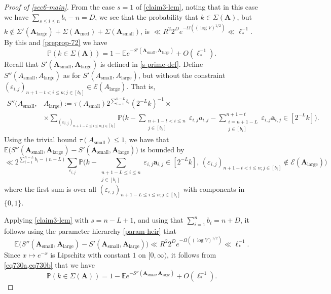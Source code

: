 \documentclass[11pt,reqno]{amsart}
\numberwithin{equation}{section}
\theoremstyle{definition}
\theoremstyle{remark}
\newcommand{\mb}{\mathbb}
\newcommand{\mbf}{\mathbf}
\newcommand{\eps}{\varepsilon}
\renewcommand{\le}{\leqslant}
\def\sml{\operatorname{small}}
\def\lrg{\operatorname{large}}
\def\med{\operatorname{med}}
\begin{document}
\begin{proof}[Proof of \cref{sec6-main}] From the case $s = 1$ of \cref{claim3-lem}, noting that in this case we have $\sum_{s \le i \le n}  b_i - n = D$, we see that the probability that $k \in \Sigma(\mbf{A})$, but $k \notin \Sigma'(\mbf{A}_{\lrg}) + \Sigma(\mbf{A}_{\med}) + \Sigma(\mbf{A}_{\sml})$, is $\ll R^2 2^{D}e^{-\Omega((\log V)^{1/2})} \ll \ell_*^{-1}$. By this and \cref{preprop-72} we have
\begin{equation}\label{eq730a} \mb{P}(k \in \Sigma(\mbf{A})) =  1 - \mb{E} e^{-S'(\mbf{A}_{\sml}, \mbf{A}_{\lrg})}  + O(\ell_*^{-1}).\end{equation} Recall that $S'(\mbf{A}_{\sml}, \mbf{A}_{\lrg})$ is defined in \cref{s-prime-def}. Define $S''(A_{\sml}, A_{\lrg})$ as for $S'(A_{\sml}, A_{\lrg})$, but without the constraint $(\eps_{i,j})_{n + 1 - t < i \le n;j \in [b_i]} \in \mathcal{E}(A_{\lrg})$. That is, 
\begin{align}\nonumber S''(A_{\sml}, & A_{\lrg}) := \tau(A_{\sml})2^{\sum_{i = 1}^{n - L} b_i} (2^{-L}k)^{-1} \times \\ & \times \sum_{(\eps_{i,j})_{ n +1 - L \le i \le n ; j \in [b_i]}}\mb{P} \big(k - \sum_{\substack{n + 1 - t < i \le n \\ j \in [b_i]}} \eps_{i,j} a_{i,j}  - \sum_{\substack{i = n+1 - L\\ j \in [b_i]}}^{n +1 - t} \eps_{i,j} \mathbf{a}_{i,j}  \in [2^{- L}k] \big)  .\label{s-prime-double-def}\end{align}
Using the trivial bound $\tau(A_{\sml}) \le 1$, we have that $\mb{E}\big( S''(\mbf{A}_{\sml},  \mbf{A}_{\lrg})  - S'(\mbf{A}_{\sml}, \mbf{A}_{\lrg})\big)$ is bounded by
\[ \ll 2^{\sum_{i=1}^{n - L} b_i - (n - L)}\sum_{\eps_{i,j}} \mb{P} \big( k  - \sum_{\substack{n + 1 - L \le i \le n \\j \in [b_i]}} \eps_{i,j} \mathbf{a}_{i,j}  \in [2^{- L}k],\, (\eps_{i,j})_{n +1 - t < i \le n; j \in [b_i]} \notin \mathcal{E}(\mbf{A}_{\lrg}) \big) \] where the first sum is over all $(\eps_{i,j})_{ n +1 - L \le i \le n ; j \in [b_i]}$ with components in $\{0,1\}$.


Applying \cref{claim3-lem} with $s = n -  L + 1$, and using that $\sum_{i = 1}^n b_i = n + D$, it follows using the parameter hierarchy \cref{param-heir} that
\begin{equation}\label{eq730b} \mb{E}\big( S''(\mbf{A}_{\sml},  \mbf{A}_{\lrg})  - S'(\mbf{A}_{\sml}, \mbf{A}_{\lrg})\big) \ll R^2 2^{D}  e^{-\Omega((\log V)^{1/2})} \ll \ell_*^{-1}.\end{equation} 
 Since $x \mapsto e^{-x}$ is Lipschitz with constant $1$ on $[0, \infty)$, it follows from \cref{eq730a,eq730b} that we have
\begin{equation}\label{eq730c} \mb{P}(k \in \Sigma(\mbf{A})) =  1 - \mb{E} e^{-S''(\mbf{A}_{\sml}, \mbf{A}_{\lrg})} + O(\ell_*^{-1}).\end{equation}


\end{proof}
\end{document}
